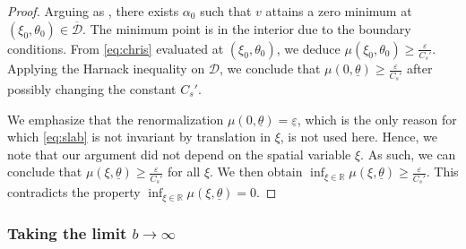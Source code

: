 \documentclass[11pt]{article}    %
\newcommand{\R}{\mathbb{R}}
\newcommand{\eps}{\varepsilon}
\begin{document}
\begin{proof}
Arguing as , there exists $\alpha_0$ such that $v$ attains a zero minimum at $(\xi_0,\theta_0) \in \overline{\mathcal{D}}$. The minimum point is in the interior due to the boundary conditions. From \eqref{eq:chris} evaluated at $(\xi_0,\theta_0)$, we deduce $\mu(\xi_0,\theta_0) \geq \frac{\eps}{C_s'}$. Applying the Harnack inequality on $\mathcal{D}$, we conclude that $\mu(0,\underline\theta) \geq \frac{\eps}{C_s'}$ after possibly changing the constant $C_s'$. 

We emphasize that the renormalization $\mu(0,\underline\theta) = \underline\eps$, which is the only reason for which \eqref{eq:slab} is not invariant by translation in $\xi$, is not used here. Hence, we note that our argument did not depend on the spatial variable $\xi$.  As such, we can conclude that $\mu(\xi,\underline\theta) \geq \frac{\eps}{C_s'}$ for all $\xi$.  
We then obtain $\inf_{\xi \in \R} \mu(\xi,\underline\theta) \geq \frac{\eps}{C_s'}$. This contradicts the property $\inf_{\xi \in \R} \mu(\xi,\underline\theta)= 0$.
\end{proof}







































\subsubsection*{Taking the limit $b\to\infty$}
\end{document}
